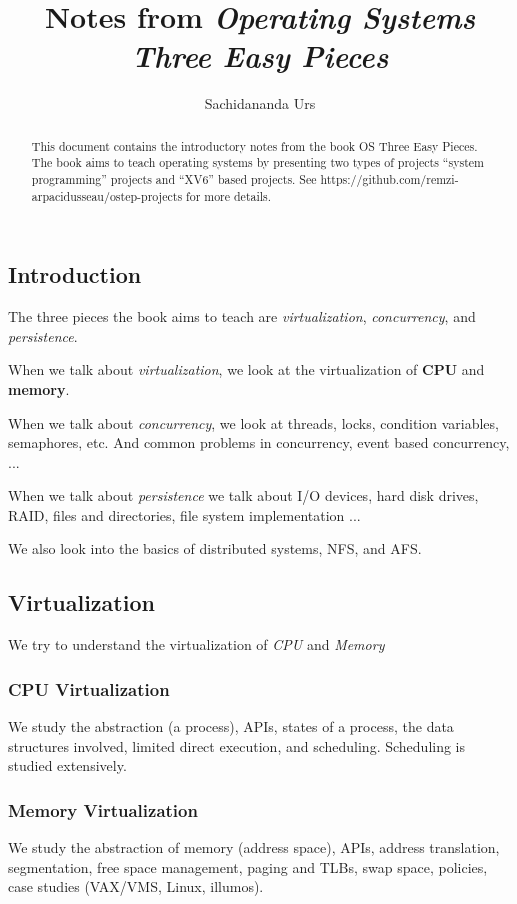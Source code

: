 \documentclass[10pt]{article}
\title{Notes from \emph{Operating Systems Three Easy Pieces}}
\author{Sachidananda Urs}
\begin{document}
\maketitle

\begin{abstract}
This document contains the introductory notes from the book OS Three
Easy Pieces. The book aims to teach operating systems by presenting two types of
projects ``system programming'' projects and ``XV6'' based projects. See
https://github.com/remzi-arpacidusseau/ostep-projects for more details.
\end{abstract}

\subsection*{Introduction}
The three pieces the book aims to teach are \emph{virtualization},
\emph{concurrency}, and \emph{persistence}.

When we talk about \emph{virtualization}, we look at the virtualization of
\textbf{CPU} and \textbf{memory}.

When we talk about \emph{concurrency}, we look at threads, locks, condition
variables, semaphores, etc. And common problems in concurrency, event based
concurrency, ...

When we talk about \emph{persistence} we talk about I/O devices, hard disk
drives, RAID, files and directories, file system implementation ...

We also look into the basics of distributed systems, NFS, and AFS.

\subsection*{Virtualization}
We try to understand the virtualization of \emph{CPU} and \emph{Memory}

\subsubsection*{CPU Virtualization}
We study the abstraction (a process), APIs, states of a process, the data
structures involved, limited direct execution, and scheduling. Scheduling is
studied extensively.

\subsubsection*{Memory Virtualization}
We study the abstraction of memory (address space), APIs, address translation,
segmentation, free space management, paging and TLBs, swap space, policies, case
studies (VAX/VMS, Linux, illumos).
\end{document}
